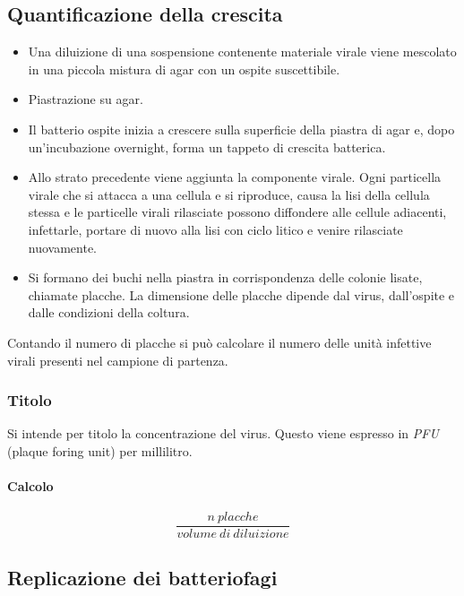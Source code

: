 	\subsection{Quantificazione della crescita}
	\begin{multicols}{2}
		\begin{itemize}
    			\item Una diluizione di una sospensione contenente materiale virale viene mescolato in una piccola mistura di agar con un ospite suscettibile. 
			\item Piastrazione su agar.
    			\item Il batterio ospite inizia a crescere sulla superficie della piastra di agar e, dopo un'incubazione overnight, forma un tappeto di crescita batterica.
    			\item Allo strato precedente viene aggiunta la componente virale.
				Ogni particella virale che si attacca a una cellula e si riproduce, causa la lisi della cellula stessa e le particelle virali rilasciate possono diffondere alle cellule adiacenti, infettarle, portare di nuovo alla lisi con ciclo litico e venire rilasciate nuovamente.
    			\item Si formano dei buchi nella piastra in corrispondenza delle colonie lisate, chiamate placche. 
				La dimensione delle placche dipende dal virus, dall'ospite e dalle condizioni della coltura.
		\end{itemize}
	\end{multicols}
	Contando il numero di placche si può calcolare il numero delle unità infettive virali presenti nel campione di partenza. 

		\subsubsection{Titolo}
		Si intende per titolo la concentrazione del virus.
		Questo viene espresso in \emph{PFU} (plaque foring unit) per millilitro.

			\paragraph{Calcolo}
			\[\dfrac{n\ placche}{volume\ di\ diluizione}\]
	
	\subsection{Replicazione dei batteriofagi}

